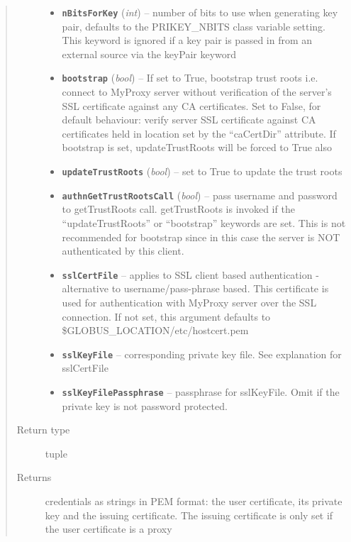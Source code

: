 \documentclass[letterpaper,10pt,english]{sphinxmanual}
\begin{document}
\begin{fulllineitems}
\begin{fulllineitems}
\begin{quote}
\begin{description}
\begin{itemize}
\item {} 
\textbf{\texttt{nBitsForKey}} (\emph{int}) -- number of bits to use when generating key pair, defaults to the PRIKEY\_NBITS class variable setting.  This keyword is ignored if a key pair is passed in from an external source via the keyPair keyword

\item {} 
\textbf{\texttt{bootstrap}} (\emph{bool}) -- If set to True, bootstrap trust roots i.e. connect to MyProxy server without verification of the server's SSL certificate against any CA certificates.  Set to False, for default behaviour: verify server SSL certificate against CA certificates held in location set by the ``caCertDir'' attribute.  If bootstrap is set, updateTrustRoots will be forced to True also

\item {} 
\textbf{\texttt{updateTrustRoots}} (\emph{bool}) -- set to True to update the trust roots

\item {} 
\textbf{\texttt{authnGetTrustRootsCall}} (\emph{bool}) -- pass username and password to getTrustRoots call.  getTrustRoots is invoked if the ``updateTrustRoots'' or ``bootstrap'' keywords are set.  This is not recommended for bootstrap since in this case the server is NOT authenticated by this client.

\item {} 
\textbf{\texttt{sslCertFile}} -- applies to SSL client based authentication - alternative to username/pass-phrase based.  This certificate is used for authentication with MyProxy server over the SSL connection.  If not set, this argument defaults to \$GLOBUS\_LOCATION/etc/hostcert.pem

\item {} 
\textbf{\texttt{sslKeyFile}} -- corresponding private key file.  See explanation for sslCertFile

\item {} 
\textbf{\texttt{sslKeyFilePassphrase}} -- passphrase for sslKeyFile.  Omit if the private key is not password protected.

\end{itemize}

\item[{Return type}] \leavevmode
tuple

\item[{Returns}] \leavevmode
credentials as strings in PEM format: the user certificate, its private key and the issuing certificate.  The issuing certificate is only set if the user certificate is a proxy


\end{description}
\end{quote}
\end{fulllineitems}
\end{fulllineitems}
\end{document}
